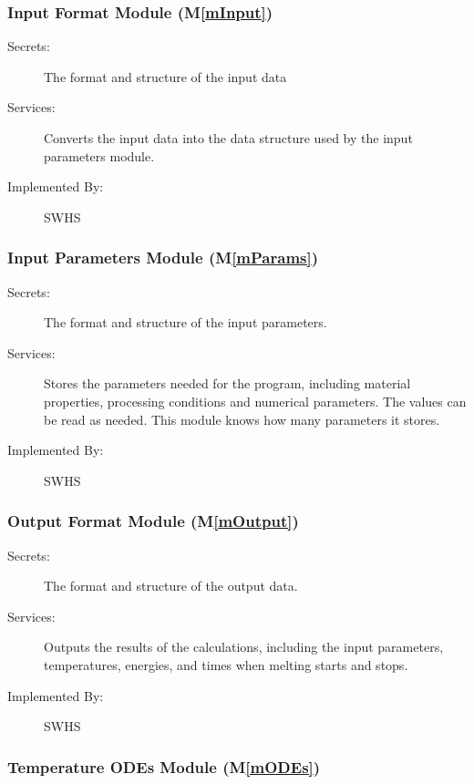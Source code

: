 \documentclass[12pt]{article}
\newcommand{\mref}[1]{M\ref{#1}}
\begin{document}
\subsubsection{Input Format Module (\mref{mInput})}

\begin{description}
\item[Secrets:]The format and structure of the input data
\item[Services:]Converts the input data into the data structure used by the
  input parameters module.
\item[Implemented By:] SWHS
\end{description}

\subsubsection{Input Parameters Module (\mref{mParams})}

\begin{description}
\item[Secrets:]The format and structure of the input parameters.
\item[Services:]Stores the parameters needed for the program, including material
  properties, processing conditions and numerical parameters.  The values can be
  read as needed.  This module knows how many parameters it stores.
\item[Implemented By:] SWHS
\end{description}

\subsubsection{Output Format Module (\mref{mOutput})}

\begin{description}
\item[Secrets:] The format and structure of the output data.
\item[Services:] Outputs the results of the calculations, including the input
  parameters, temperatures, energies, and times when melting starts and stops.
\item[Implemented By:] SWHS
\end{description} 

\subsubsection{Temperature ODEs Module (\mref{mODEs})}
\end{document}
